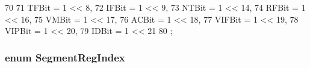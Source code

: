 \begin{DoxyCode}
70                   {
71         TFBit = 1 << 8,
72         IFBit = 1 << 9,
73         NTBit = 1 << 14,
74         RFBit = 1 << 16,
75         VMBit = 1 << 17,
76         ACBit = 1 << 18,
77         VIFBit = 1 << 19,
78         VIPBit = 1 << 20,
79         IDBit = 1 << 21
80     };
\end{DoxyCode}
\hypertarget{namespaceX86ISA_acea32b07c2303d31296b1c07a16c4795}{
\subsubsection[{SegmentRegIndex}]{\setlength{\rightskip}{0pt plus 5cm}enum {\bf SegmentRegIndex}}}
\label{namespaceX86ISA_acea32b07c2303d31296b1c07a16c4795}
